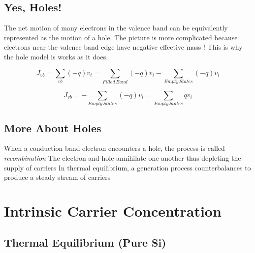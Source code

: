 \subsection{Yes, Holes!}

The net motion of many electrons in the valence band can be equivalently represented as the motion of a hole.  The picture is more complicated because electrons near the valence band edge have negative effective mass !  This is why the hole model is works as it does.  
 

\begin{equation}
{J_{vb}} = \sum\limits_{vb} {( - q){v_i}}  = \sum\limits_{Filled\,Band} {( - q){v_i} - \sum\limits_{Empty\,States} {( - q){v_i}} } 
\end{equation}

\begin{equation}
{J_{vb}} =  - \sum\limits_{Empty\,States} {( - q){v_i}}  = \sum\limits_{Empty\,States} {q{v_i}} 
\end{equation}





\subsection{More About Holes}


  
 When a conduction band electron encounters a hole, the process is called \textit{recombination}
 The electron and hole annihilate one another thus depleting the supply of carriers
 In thermal equilibrium, a generation process counterbalances to produce a steady stream of carriers
 






\section{Intrinsic Carrier Concentration}











\subsection{Thermal Equilibrium (Pure Si)}


